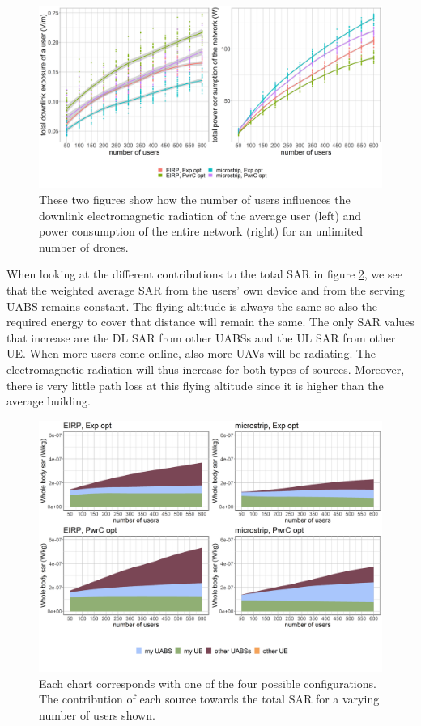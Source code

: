 \documentclass[twocolumn]{phdsymp} %
\begin{document}
\begin{figure}[h!]
  \includegraphics[width=\linewidth]{../results/s3/uvsdlAndPc.png}
  \caption{These two figures show how the number of users influences the downlink electromagnetic radiation of the average user (left) and 
  power consumption of the entire network (right) for an unlimited number of drones.}
  \label{fig:s3b_dlAndPC}
\end{figure}

When looking at the different contributions to the total \gls{SAR} in figure \ref{fig:s3b_fourSourcesMatrix}, 
we see that the weighted average 
\gls{SAR} from the users' own device and from the serving \gls{UABS} remains constant. The flying altitude is always the same so 
also the required energy to cover that distance will remain the same. 
The only \gls{SAR} values that increase are the \gls{DL} \gls{SAR} from other \gls{UABS}s and the \gls{UL} \gls{SAR} 
from other \gls{UE}. 
When more users come online, also more \gls{UAV}s will be radiating. The electromagnetic
radiation will thus increase for both types of sources. Moreover, there is very little path loss at this flying altitude since it 
is higher than the average building.

\begin{figure}[h!]
  \includegraphics[width=\linewidth]{../results/s3/uFourSources.png}
  \caption{Each chart corresponds with one of the four possible configurations. The contribution of each source towards the total 
  \gls{SAR} for a varying number of users shown.}
  \label{fig:s3b_fourSourcesMatrix}
\end{figure}
\end{document}
